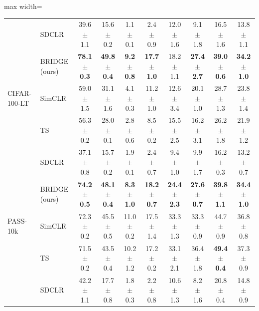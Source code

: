 \begin{table}[t]
\begin{adjustbox}{max width=\textwidth}
\begin{tabular}{l l c c c c c c c c}
 & SDCLR & 39.6 {\scriptsize$\pm$ 1.1} & 15.6 {\scriptsize$\pm$ 0.2} & 1.1 {\scriptsize$\pm$ 0.1} & 2.4 {\scriptsize$\pm$ 0.9} & 12.0 {\scriptsize$\pm$ 1.6} & 9.1 {\scriptsize$\pm$ 1.8} & 16.5 {\scriptsize$\pm$ 1.6} & 13.8 {\scriptsize$\pm$ 1.1} \\
\rowcolor{blue!10} & BRIDGE (ours) & \textbf{78.1 {\scriptsize$\pm$ 0.3}} & \textbf{49.8 {\scriptsize$\pm$ 0.4}} & \textbf{9.2 {\scriptsize$\pm$ 0.8}} & \textbf{17.7 {\scriptsize$\pm$ 1.0}} & 18.2 {\scriptsize$\pm$ 1.1} & \textbf{27.4 {\scriptsize$\pm$ 2.7}} & \textbf{39.0 {\scriptsize$\pm$ 0.6}} & \textbf{34.2 {\scriptsize$\pm$ 1.0}} \\
\midrule
CIFAR-100-LT & SimCLR & 59.0 {\scriptsize$\pm$ 1.5} & 31.1 {\scriptsize$\pm$ 1.6} & 4.1 {\scriptsize$\pm$ 0.3} & 11.2 {\scriptsize$\pm$ 1.0} & 12.6 {\scriptsize$\pm$ 3.4} & 20.1 {\scriptsize$\pm$ 1.0} & 28.7 {\scriptsize$\pm$ 1.3} & 23.8 {\scriptsize$\pm$ 1.4} \\
 & TS & 56.3 {\scriptsize$\pm$ 0.2} & 28.0 {\scriptsize$\pm$ 0.1} & 2.8 {\scriptsize$\pm$ 0.6} & 8.5 {\scriptsize$\pm$ 0.2} & 15.5 {\scriptsize$\pm$ 2.5} & 16.2 {\scriptsize$\pm$ 3.1} & 26.2 {\scriptsize$\pm$ 1.8} & 21.9 {\scriptsize$\pm$ 1.2} \\
 & SDCLR & 37.1 {\scriptsize$\pm$ 0.8} & 15.7 {\scriptsize$\pm$ 0.2} & 1.9 {\scriptsize$\pm$ 0.1} & 2.4 {\scriptsize$\pm$ 0.7} & 9.4 {\scriptsize$\pm$ 1.0} & 9.9 {\scriptsize$\pm$ 1.7} & 16.2 {\scriptsize$\pm$ 0.3} & 13.2 {\scriptsize$\pm$ 0.7} \\
\rowcolor{blue!10} & BRIDGE (ours) & \textbf{74.2 {\scriptsize$\pm$ 0.5}} & \textbf{48.1 {\scriptsize$\pm$ 0.4}} & \textbf{8.3 {\scriptsize$\pm$ 1.0}} & \textbf{18.2 {\scriptsize$\pm$ 0.7}} & \textbf{24.4 {\scriptsize$\pm$ 2.3}} & \textbf{27.6 {\scriptsize$\pm$ 0.7}} & \textbf{39.8 {\scriptsize$\pm$ 1.1}} & \textbf{34.4 {\scriptsize$\pm$ 1.0}} \\
\midrule
PASS-10k & SimCLR & 72.3 {\scriptsize$\pm$ 0.2} & 45.5 {\scriptsize$\pm$ 0.5} & 11.0 {\scriptsize$\pm$ 0.2} & 17.5 {\scriptsize$\pm$ 1.4} & 33.3 {\scriptsize$\pm$ 1.3} & 33.3 {\scriptsize$\pm$ 0.9} & 44.7 {\scriptsize$\pm$ 0.9} & 36.8 {\scriptsize$\pm$ 0.8} \\
 & TS & 71.5 {\scriptsize$\pm$ 0.2} & 43.5 {\scriptsize$\pm$ 0.4} & 10.2 {\scriptsize$\pm$ 1.2} & 17.2 {\scriptsize$\pm$ 0.2} & 33.1 {\scriptsize$\pm$ 2.1} & 36.4 {\scriptsize$\pm$ 1.8} & \textbf{49.4 {\scriptsize$\pm$ 0.4}} & 37.3 {\scriptsize$\pm$ 0.9} \\
 & SDCLR & 42.2 {\scriptsize$\pm$ 1.1} & 17.7 {\scriptsize$\pm$ 0.8} & 1.8 {\scriptsize$\pm$ 0.3} & 2.2 {\scriptsize$\pm$ 0.8} & 10.6 {\scriptsize$\pm$ 1.3} & 8.2 {\scriptsize$\pm$ 1.6} & 20.8 {\scriptsize$\pm$ 0.4} & 14.8 {\scriptsize$\pm$ 0.9} \\

\end{tabular}
\end{adjustbox}
\end{table}
